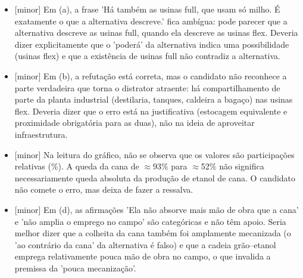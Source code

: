 \documentclass{article}%
\begin{document}
\begin{itemize}%
\item%
{[}minor{]} Em (a), a frase 'Há também as usinas full, que usam só milho. É exatamente o que a alternativa descreve.' fica ambígua: pode parecer que a alternativa descreve as usinas full, quando ela descreve as usinas flex. Deveria dizer explicitamente que o 'poderá' da alternativa indica uma possibilidade (usinas flex) e que a existência de usinas full não contradiz a alternativa.%
\item%
{[}minor{]} Em (b), a refutação está correta, mas o candidato não reconhece a parte verdadeira que torna o distrator atraente: há compartilhamento de parte da planta industrial (destilaria, tanques, caldeira a bagaço) nas usinas flex. Deveria dizer que o erro está na justificativa (estocagem equivalente e proximidade obrigatória para as duas), não na ideia de aproveitar infraestrutura.%
\item%
{[}minor{]} Na leitura do gráfico, não se observa que os valores são participações relativas (\%). A queda da cana de $\approx$93\% para $\approx$52\% não significa necessariamente queda absoluta da produção de etanol de cana. O candidato não comete o erro, mas deixa de fazer a ressalva.%
\item%
{[}minor{]} Em (d), as afirmações 'Ela não absorve mais mão de obra que a cana' e 'não amplia o emprego no campo' são categóricas e não têm apoio. Seria melhor dizer que a colheita da cana também foi amplamente mecanizada (o 'ao contrário da cana' da alternativa é falso) e que a cadeia grão--etanol emprega relativamente pouca mão de obra no campo, o que invalida a premissa da 'pouca mecanização'.%
\end{itemize}%
\end{document}
